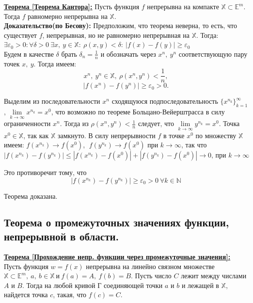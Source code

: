 \documentclass[a4paper,12pt]{article} %
\renewcommand {\geq}{\geqslant}
\renewcommand {\leq}{\leqslant}
\begin{document}
\underline{\textbf{Теорема [Теорема Кантора]:}} Пусть функция $f$ непрерывна на компакте $\mathbb{X} \subset \mathbb{E}^m$. Тогда $f$
равномерно непрерывна на $\mathbb{X}$.\\

\textbf{Доказательство(по Бесову):} Предположим, что теорема неверна, то есть, что существует $f$, непрерывная, но не равномерно
непрерывная на $\mathbb{X}$. Тогда:
\\$ \exists \varepsilon_0 > 0 : \forall \delta > 0 ~\exists x, ~y \in \mathbb{X}: ~\rho(x, y) < \delta: ~ |f(x) - f(y)| \geq \varepsilon_0$
\\Будем в качестве $\delta$ брать $\delta_n = \frac{1}{n}$ и обозначать через $x^{n}, ~y^{n}$ соответствующую пару точек $x, ~y$. Тогда имеем:
$$x^{n}, ~y^{n} \in \mathbb{X}, ~\rho(x^{n}, y^{n}) < \frac{1}{n},$$
$$|f(x^{n}) - f(y^{n})| \geq \varepsilon_0 > 0.$$

Выделим из последовательности ${x^{n}}$ сходящуюся подпоследовательность $\{x^{n_k}\}_{k = 1}^\infty$,
$\lim\limits_{k \to \infty}x^{n_k} = x^{0}$, что возможно по теореме Больцано-Вейерштрасса в силу ограниченности
$x^{n}$. Тогда из $\rho(x^{n}, y^{n}) < \frac{1}{n}$ следует, что $\lim\limits_{k \to \infty}y^{n_k} = x^{0}$.
Точка $x^{0} \in \mathbb{X}$, так как $\mathbb{X}$ замкнуто. В силу непрерывности $f$ в точке
$x^{0}$ по множеству $\mathbb{X}$ имеем:
$f(x^{n_k}) \to f(x^{0})$, $\; f(y^{n_k}) \to f(x^{0})$ при $k \to \infty$, так что
$$|f(x^{n_k}) - f(y^{n_k})| \leq  |f(x^{n_k}) - f(x^{0})| + |f(y^{n_k}) - f(x^{0})| \to 0 \text{, при } k \to \infty$$

Это противоречит тому, что 
$$|f(x^{n_k}) - f(y^{n_k})| \geq \varepsilon_0 > 0 ~\forall k \in \mathbb{N}$$

Теорема доказана.

\subsection{Теорема о промежуточных значениях функции, непрерывной в области.}

\underline{\textbf{Теорема [Прохождение непр. функции через промежуточные значения]:}}\\

Пусть функция $w = f(x)$ непрерывна на линейно связном множестве $\mathbb{X} \subset \mathbb{E}^m, ~ a, ~ b \in \mathbb{X} ~ и ~ f(a) = A, ~ f(b) = B$. Пусть число $C$ лежит между числами $A$ и $B$. Тогда на любой кривой $Г$ соединяющей точки $a$ и $b$ и лежащей в $\mathbb{X}$, найдется точка $c$, такая, что $f(c) = C$.\\
\end{document}

